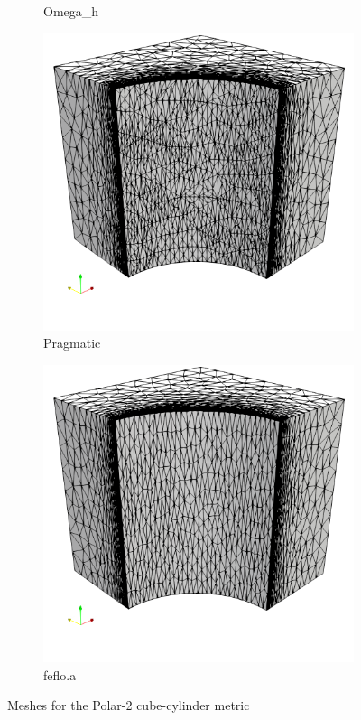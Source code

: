 \documentclass[3p,times,procedia,number]{elsarticle}
\begin{document}
\begin{figure}
\begin{subfigure}{.24\textwidth}
\caption{Omega\_h}
\end{subfigure}
\begin{subfigure}{.24\textwidth}
\centering
\includegraphics[width=\textwidth]{pragmatic-cube-cylinder-polar-2.png}
\caption{Pragmatic}
\end{subfigure}
\begin{subfigure}{.24\textwidth}
\centering
\includegraphics[width=\textwidth]{fefloa-cube-cylinder-polar-2.png}
\caption{feflo.a}
\end{subfigure}
\caption{Meshes for the Polar-2 cube-cylinder metric}
\label{fig:cube-cylinder-polar-2-meshes}
\end{figure}
\end{document}
